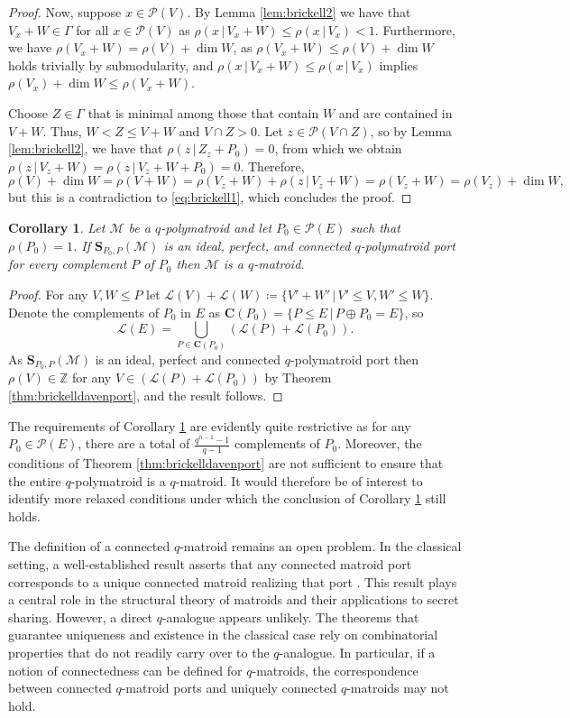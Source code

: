 \documentclass[onecolumn,draftclsnofoot,12pt]{IEEEtran}
\renewcommand{\L}{\mathcal{L}}
\renewcommand{\P}{\mathcal{P}}
\renewcommand{\S}{\mathbf{S}}
\newcommand{\M}{\mathcal{M}}
\theoremstyle{plain} %
\newtheorem{corollary}[theorem]{Corollary}
\theoremstyle{definition}
\begin{document}
\begin{proof}
Now, suppose $x\in \P(V)$. By Lemma \ref{lem:brickell2} we have that $V_x + W\in \Gamma$ for all $x\in \P(V)$ as $\rho(x\,|\, V_x + W)  \leq \rho(x\,|\, V_x) <1$. Furthermore, we have $\rho(V_x+W) = \rho(V) + \dim W$, as $\rho(V_x+W)\leq \rho(V) + \dim W$ holds trivially by submodularity, and $\rho(x\,|\, V_x + W) \leq \rho(x\,|\, V_x)$ implies $ \rho(V_x) + \dim W \leq \rho(V_x+W)$.


Choose $Z\in \Gamma$ that is minimal among those that contain $W$ and are contained in $V+W$. Thus, $W<Z \leq V+W$ and $V\cap Z >0$. Let $z\in \P(V\cap Z)$, so by Lemma \ref{lem:brickell2}, we have that $\rho(z\,|\, Z_z +P_0) = 0$, from which we obtain $\rho(z\,|\, V_z + W) = \rho(z\,|\, V_z +W+P_0) = 0.$ Therefore,
\[
    \rho(V) + \dim W = \rho(V+W) = \rho(V_z+W) + \rho(z\,|\, V_z+W) = \rho(V_z+W) = \rho(V_z) + \dim W,
\]
but this is a contradiction to \eqref{eq:brickell1}, which concludes the proof.
\end{proof}

\begin{corollary}
Let $\M$ be a $q$-polymatroid and let $P_0\in \P(E)$ such that $\rho(P_0)=1$. If $\S_{P_0,P}(\M)$ is an ideal, perfect, and connected $q$-polymatroid port for every complement $P$ of $P_0$ then $\M$ is a $q$-matroid. \label{cor:brickelldavenport}
\end{corollary}
\begin{proof}
For any $V,W\leq P$ let $\L(V)+\L(W) \coloneqq \{ V'+W' \,|\, V'\leq V, W'\leq W\}$. Denote the complements of $P_0$ in $E$ as $\mathbf{C}(P_0) = \{P\leq E \,|\, P\oplus P_0 = E\}$, so
\[
    \L(E) = \bigcup_{P\in \mathbf{C}(P_0)} (\L(P) + \L(P_0)).
\]
As $\S_{P_0,P}(\M)$ is an ideal, perfect and connected $q$-polymatroid port then $\rho(V)\in \mathbb{Z}$ for any $V\in (\L(P) +\L(P_0))$ by Theorem \ref{thm:brickelldavenport}, and the result follows.
\end{proof}

The requirements of Corollary \ref{cor:brickelldavenport} are evidently quite restrictive as for any $P_0 \in \mathcal{P}(E)$, there are a total of $\frac{q^{n-1}-1}{q-1}$ complements of $P_0$. Moreover, the conditions of Theorem \ref{thm:brickelldavenport} are not sufficient to ensure that the entire $q$-polymatroid is a $q$-matroid. It would therefore be of interest to identify more relaxed conditions under which the conclusion of Corollary \ref{cor:brickelldavenport} still holds.


The definition of a connected $q$-matroid remains an open problem. In the classical setting, a well-established result asserts that any connected matroid port corresponds to a unique connected matroid realizing that port \cite{Lehman}. This result plays a central role in the structural theory of matroids and their applications to secret sharing. However, a direct $q$-analogue appears unlikely. The theorems that guarantee uniqueness and existence in the classical case rely on combinatorial properties that do not readily carry over to the $q$-analogue. In particular, if a notion of connectedness can be defined for $q$-matroids, the correspondence between connected $q$-matroid ports and uniquely connected $q$-matroids may not hold.
\end{document}
